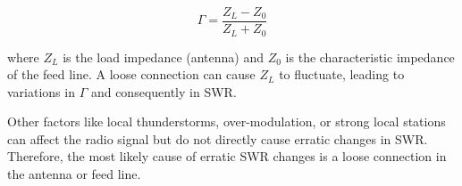 \[
\Gamma = \frac{Z_L - Z_0}{Z_L + Z_0}
\]

where \(Z_L\) is the load impedance (antenna) and \(Z_0\) is the characteristic impedance of the feed line. A loose connection can cause \(Z_L\) to fluctuate, leading to variations in \(\Gamma\) and consequently in SWR.

Other factors like local thunderstorms, over-modulation, or strong local stations can affect the radio signal but do not directly cause erratic changes in SWR. Therefore, the most likely cause of erratic SWR changes is a loose connection in the antenna or feed line.

